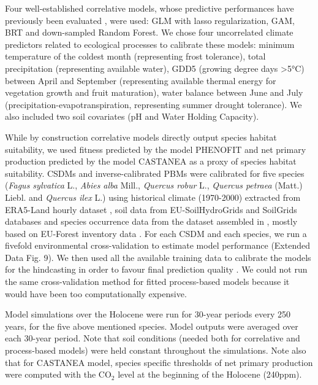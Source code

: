\documentclass[pdflatex, sn-nature]{sn-jnl}%
\newcommand{\textappr}{\raisebox{0.5ex}{\texttildelow}} %
\begin{document}
Four well-established correlative models, whose predictive performances have previously been evaluated \cite{Valavi2022}, were used: GLM with lasso regularization, GAM, BRT and down-sampled Random Forest. We chose four uncorrelated climate predictors related to ecological processes to calibrate these models: minimum temperature of the coldest month (representing frost tolerance), total precipitation (representing available water), GDD5 (growing degree days  \textgreater5°C) between April and September (representing available thermal energy for vegetation growth and fruit maturation), water balance between June and July (precipitation-evapotranspiration, representing summer drought tolerance). We also included two soil covariates (pH and Water Holding Capacity).
  
While by construction correlative models directly output species habitat suitability, we used fitness predicted by the model PHENOFIT and net primary production predicted by the model CASTANEA as a proxy of species habitat suitability. 
CSDMs and inverse-calibrated PBMs were calibrated for five species (\textit{Fagus sylvatica} L., \textit{Abies alba} Mill., \textit{Quercus robur} L., \textit{Quercus petraea}  (Matt.) Liebl. and \textit{Quercus ilex} L.) using historical climate (1970-2000) extracted from ERA5-Land hourly dataset \cite{MunozSabater2021}, soil data from EU-SoilHydroGrids \cite{Toth2017} and SoilGrids \cite{Hengl2017} databases and species occurrence data from the dataset assembled in \cite{VanderMeersch2023}, mostly based on EU-Forest inventory data \cite{Mauri2017}. For each CSDM and each species, we run a fivefold environmental cross-validation to estimate model performance (Extended Data Fig. 9). We then used all the available training data to calibrate the models for the hindcasting in order to favour final prediction quality \cite{Roberts2017}. We could not run the same cross-validation method for fitted process-based models because it would have been too computationally expensive.   

Model simulations over the Holocene were run for 30-year periods every 250 years, for the five above mentioned species. Model outputs were averaged over each 30-year period. Note that soil conditions (needed both for correlative and process-based models) were held constant throughout the simulations. Note also that for CASTANEA model, species specific thresholds of net primary production were computed with the CO$_2$ level at the beginning of the Holocene (\textappr240ppm).
\end{document}
